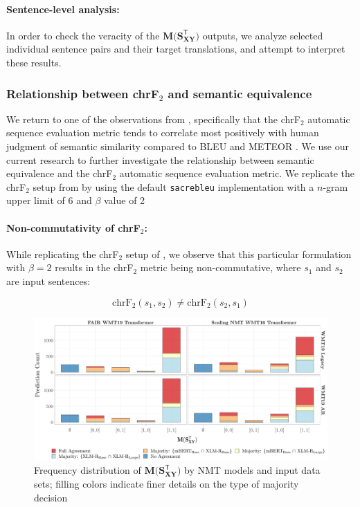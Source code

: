 \documentclass[11pt,a4paper]{article}
\begin{document}
\paragraph{Sentence-level analysis:} In order to check the veracity of the $\mathbf{M(S_{XY}^{\mathsf{T}}})$ outputs, we analyze selected individual sentence pairs and their target translations, and attempt to interpret these results.

\subsubsection{Relationship between chrF$_2$ and semantic equivalence}

We return to one of the observations from \citet{michel2019evaluation}, specifically that the chrF$_2$ automatic sequence evaluation metric \cite{popovic2015chrf} tends to correlate most positively with human judgment of semantic similarity compared to BLEU \cite{papineni2002bleu} and METEOR \cite{denkowski2014meteor}. We use our current research to further investigate the relationship between semantic equivalence and the chrF$_2$ automatic sequence evaluation metric. We replicate the chrF$_2$ setup from \citet{michel2019evaluation} by using the default \texttt{sacrebleu} implementation \cite{post-2018-call} with a $n$-gram upper limit of 6 and $\beta$ value of 2

\paragraph{Non-commutativity of chrF$_2$:} While replicating the chrF$_2$ setup of \citet{michel2019evaluation}, we observe that this particular formulation with $\beta = 2$ results in the chrF$_2$ metric being non-commutative, where $s_1$ and $s_2$ are input sentences:

\begin{equation}
  \text{chrF}_{2}(s_1,s_2) \neq \text{chrF}_{2}(s_2,s_1)
\end{equation}

\begin{figure}
  \centering 
  \includegraphics[trim={0cm 0cm 0cm 0cm},clip,width=\textwidth]{paraphrase_detection_joint_decision.pdf}
  \caption{Frequency distribution of $\mathbf{M(S_{XY}^{\mathsf{T}}})$ by NMT models and input data sets; filling colors indicate finer details on the type of majority decision}
  \label{paraphrase_detection_joint_decision}
\end{figure}
\end{document}
